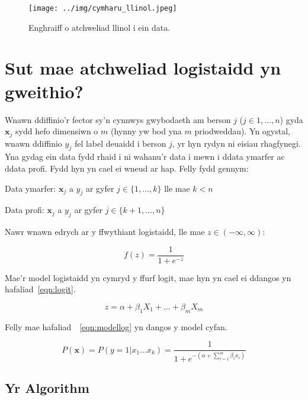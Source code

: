 \begin{figure}[H]
\begin{center}
\texttt{[image: ../img/cymharu\_llinol.jpeg]}
\label{fig:Enghraifft_o_atchweliad_llinol}
\caption{Enghraiff o atchweliad llinol i ein data.}
\end{center}
\end{figure}

\section{Sut mae atchweliad logistaidd yn gweithio?}

Wnawn ddiffinio'r fector sy'n cynnwys gwybodaeth am berson $j$ ($j \in {1,\dots,n}$) gyda $\mathbf{x}_j$ sydd hefo dimensiwn o $m$ (hynny yw bod yna $m$ priodweddau). Yn ogystal, wnawn ddiffinio $y_j$ fel label deuaidd i berson $j$, yr hyn rydyn ni eisiau rhagfynegi. Yna gydag ein data fydd rhaid i ni wahanu'r data i mewn i ddata ymarfer ac ddata profi. Fydd hyn yn cael ei wneud ar hap. Felly fydd gennym:

Data ymarfer: $\mathbf{x}_j$ a $y_j$ ar gyfer $j \in \{ 1,\dots,k\}$ lle mae $k<n$

Data profi: $\mathbf{x}_j$ a $y_j$ ar gyfer $j \in \{ k+1,\dots,n \}$

Nawr wnawn edrych ar y ffwythiant logistaidd, lle mae $z \in (-\infty,\infty)$:

$$ f(z) = \frac{1}{1+e^{-z}} $$ 

Mae'r model logistaidd yn cymryd y ffurf logit, mae hyn yn cael ei ddangos yn hafaliad~\ref{eqn:logit}.

\begin{equation}\label{eqn:logit} 
    z = \alpha + \beta_{1}X_{1} + \dots + \beta_{m}X_{m} 
\end{equation} %

Felly mae hafaliad~~\ref{eqn:modellog} yn dangos y model cyfan.

\begin{equation}\label{eqn:modellog}
    P(\mathbf{x}) = P(y = 1 | x_1 \dots x_k) = \frac{1}{1+e^{-( \alpha + \sum_{i=1}^{m} \beta_{i}x_{i})}} 
\end{equation}

\subsection{Yr Algorithm}

